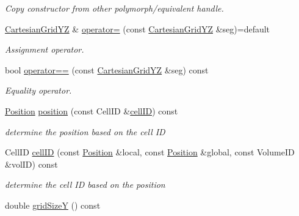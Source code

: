 \begin{DoxyCompactItemize}
\begin{DoxyCompactList}\small\item\em Copy constructor from other polymorph/equivalent handle. \end{DoxyCompactList}\item 
\hyperlink{class_d_d4hep_1_1_geometry_1_1_cartesian_grid_y_z}{Cartesian\+Grid\+YZ} \& \hyperlink{class_d_d4hep_1_1_geometry_1_1_cartesian_grid_y_z_a5292ec43a2410e91d6b65003189833cf}{operator=} (const \hyperlink{class_d_d4hep_1_1_geometry_1_1_cartesian_grid_y_z}{Cartesian\+Grid\+YZ} \&seg)=default
\begin{DoxyCompactList}\small\item\em Assignment operator. \end{DoxyCompactList}\item 
bool \hyperlink{class_d_d4hep_1_1_geometry_1_1_cartesian_grid_y_z_a105528da43274bc50d362c7cdc0ad9e9}{operator==} (const \hyperlink{class_d_d4hep_1_1_geometry_1_1_cartesian_grid_y_z}{Cartesian\+Grid\+YZ} \&seg) const
\begin{DoxyCompactList}\small\item\em Equality operator. \end{DoxyCompactList}\item 
\hyperlink{namespace_d_d4hep_1_1_geometry_a55083902099d03506c6db01b80404900}{Position} \hyperlink{class_d_d4hep_1_1_geometry_1_1_cartesian_grid_y_z_a6b71539219f5b4008d16fb832c81e238}{position} (const Cell\+ID \&\hyperlink{class_d_d4hep_1_1_geometry_1_1_cartesian_grid_y_z_a90bd49763478a3495fc0f00b6284a65d}{cell\+ID}) const
\begin{DoxyCompactList}\small\item\em determine the position based on the cell ID \end{DoxyCompactList}\item 
Cell\+ID \hyperlink{class_d_d4hep_1_1_geometry_1_1_cartesian_grid_y_z_a90bd49763478a3495fc0f00b6284a65d}{cell\+ID} (const \hyperlink{namespace_d_d4hep_1_1_geometry_a55083902099d03506c6db01b80404900}{Position} \&local, const \hyperlink{namespace_d_d4hep_1_1_geometry_a55083902099d03506c6db01b80404900}{Position} \&global, const Volume\+ID \&vol\+ID) const
\begin{DoxyCompactList}\small\item\em determine the cell ID based on the position \end{DoxyCompactList}\item 
double \hyperlink{class_d_d4hep_1_1_geometry_1_1_cartesian_grid_y_z_a10357a2a916abbc6fc41c23a50d98e78}{grid\+SizeY} () const

\end{DoxyCompactItemize}
